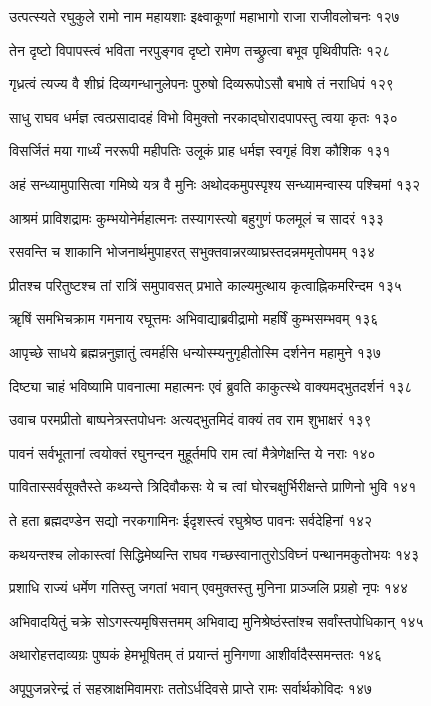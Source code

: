 उत्पत्स्यते रघुकुले रामो नाम महायशाः
इक्ष्वाकूणां महाभागो राजा राजीवलोचनः १२७

तेन दृष्टो विपापस्त्वं भविता नरपुङ्गव
दृष्टो रामेण तच्छ्रुत्वा बभूव पृथिवीपतिः १२८

गृध्रत्वं त्यज्य वै शीघ्रं दिव्यगन्धानुलेपनः
पुरुषो दिव्यरूपोऽसौ बभाषे तं नराधिपं १२९

साधु राघव धर्मज्ञ त्वत्प्रसादादहं विभो
विमुक्तो नरकाद्घोरादपापस्तु त्वया कृतः १३०

विसर्जितं मया गार्ध्यं नररूपी महीपतिः
उलूकं प्राह धर्मज्ञ स्वगृहं विश कौशिक १३१

अहं सन्ध्यामुपासित्वा गमिष्ये यत्र वै मुनिः
अथोदकमुपस्पृश्य सन्ध्यामन्वास्य पश्चिमां १३२

आश्रमं प्राविशद्रामः कुम्भयोनेर्महात्मनः
तस्यागस्त्यो बहुगुणं फलमूलं च सादरं १३३

रसवन्ति च शाकानि भोजनार्थमुपाहरत्
सभुक्तवान्नरव्याघ्रस्तदन्नममृतोपमम् १३४

प्रीतश्च परितुष्टश्च तां रात्रिं समुपावसत्
प्रभाते काल्यमुत्थाय कृत्वाह्निकमरिन्दम १३५

ॠषिं समभिचक्राम गमनाय रघूत्तमः
अभिवाद्याब्रवीद्रामो महर्षिं कुम्भसम्भवम् १३६

आपृच्छे साधये ब्रह्मन्ननुज्ञातुं त्वमर्हसि
धन्योस्म्यनुगृहीतोस्मि दर्शनेन महामुने १३७

दिष्ट्या चाहं भविष्यामि पावनात्मा महात्मनः
एवं ब्रुवति काकुत्स्थे वाक्यमद्भुतदर्शनं १३८

उवाच परमप्रीतो बाष्पनेत्रस्तपोधनः
अत्यद्भुतमिदं वाक्यं तव राम शुभाक्षरं १३९

पावनं सर्वभूतानां त्वयोक्तं रघुनन्दन
मुहूर्तमपि राम त्वां मैत्रेणेक्षन्ति ये नराः १४०

पावितास्सर्वसूक्तैस्ते कथ्यन्ते त्रिदिवौकसः
ये च त्वां घोरचक्षुर्भिरीक्षन्ते प्राणिनो भुवि १४१

ते हता ब्रह्मदण्डेन सद्यो नरकगामिनः
ईदृशस्त्वं रघुश्रेष्ठ पावनः सर्वदेहिनां १४२

कथयन्तश्च लोकास्त्वां सिद्धिमेष्यन्ति राघव
गच्छस्वानातुरोऽविघ्नं पन्थानमकुतोभयः १४३

प्रशाधि राज्यं धर्मेण गतिस्तु जगतां भवान्
एवमुक्तस्तु मुनिना प्राञ्जलि प्रग्रहो नृपः १४४

अभिवादयितुं चक्रे सोऽगस्त्यमृषिसत्तमम्
अभिवाद्य मुनिश्रेष्ठंस्तांश्च सर्वांस्तपोधिकान् १४५

अथारोहत्तदाव्यग्रः पुष्पकं हेमभूषितम्
तं प्रयान्तं मुनिगणा आशीर्वादैस्समन्ततः १४६

अपूपुजन्नरेन्द्रं तं सहस्राक्षमिवामराः
ततोऽर्धदिवसे प्राप्ते रामः सर्वार्थकोविदः १४७

